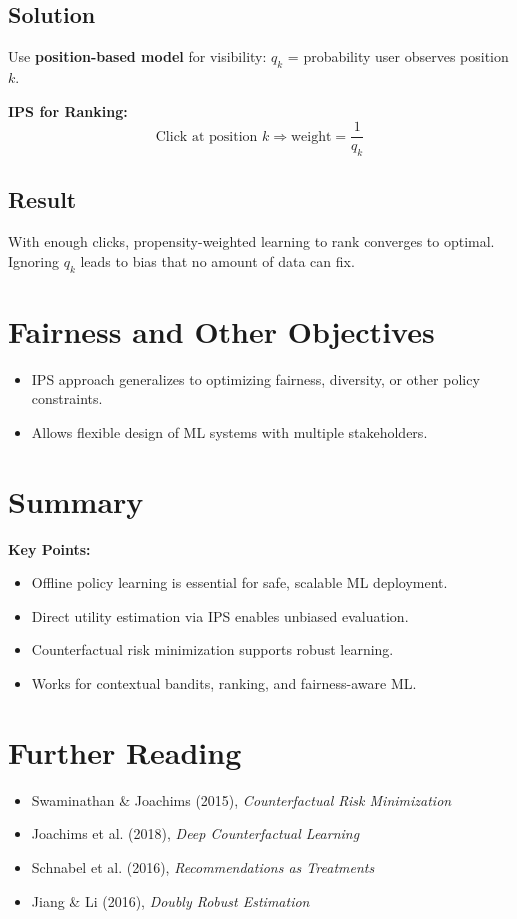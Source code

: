 \documentclass[11pt]{article}
\begin{document}
\subsection*{Solution}
Use \textbf{position-based model} for visibility: $q_k$ = probability user observes position $k$.

\textbf{IPS for Ranking:}
\[
\text{Click at position } k \Rightarrow \text{weight} = \frac{1}{q_k}
\]

\subsection*{Result}
With enough clicks, propensity-weighted learning to rank converges to optimal. Ignoring $q_k$ leads to bias that no amount of data can fix.

\section{Fairness and Other Objectives}
\begin{itemize}
  \item IPS approach generalizes to optimizing fairness, diversity, or other policy constraints.
  \item Allows flexible design of ML systems with multiple stakeholders.
\end{itemize}

\section{Summary}

\textbf{Key Points:}
\begin{itemize}
  \item Offline policy learning is essential for safe, scalable ML deployment.
  \item Direct utility estimation via IPS enables unbiased evaluation.
  \item Counterfactual risk minimization supports robust learning.
  \item Works for contextual bandits, ranking, and fairness-aware ML.
\end{itemize}

\section{Further Reading}

\begin{itemize}
  \item Swaminathan \& Joachims (2015), \textit{Counterfactual Risk Minimization}
  \item Joachims et al. (2018), \textit{Deep Counterfactual Learning}
  \item Schnabel et al. (2016), \textit{Recommendations as Treatments}
  \item Jiang \& Li (2016), \textit{Doubly Robust Estimation}
\end{itemize}
\end{document}
